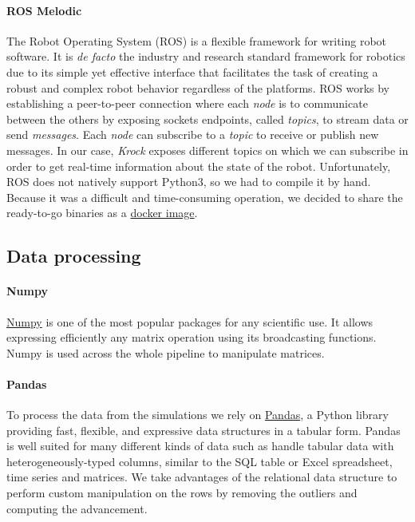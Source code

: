 \documentclass[../document.tex]{subfiles}
\begin{document}
\paragraph{ROS Melodic} The Robot Operating System (ROS) \cite{ROS} is a flexible framework for writing robot software. It is \emph{de facto} the industry and research standard framework for robotics due to its simple yet effective interface that facilitates the task of creating a robust and complex robot behavior regardless of the platforms. ROS works by establishing a peer-to-peer connection where each \emph{node} is to communicate between the others by exposing sockets endpoints, called \emph{topics}, to stream data or send \emph{messages}. Each \emph{node} can subscribe to a \emph{topic} to receive or publish new messages. In our case, \emph{Krock} exposes different topics on which we can subscribe in order to get real-time information about the state of the robot.
Unfortunately, ROS does not natively support Python3, so we had to compile it by hand. Because it was a difficult and time-consuming operation, we decided to share the ready-to-go binaries as a \href{https://hub.docker.com/r/zuppif/ros-melodic-python3/}{docker image}. 

\subsection{Data processing}
\paragraph{Numpy}\href{https://www.numpy.org/}{Numpy} is one of the most popular packages for any scientific use. It allows expressing efficiently any matrix operation using its broadcasting functions. Numpy is used across the whole pipeline to manipulate matrices.
\paragraph{Pandas}To process the data from the simulations we rely on \href{https://pandas.pydata.org/}{Pandas}, a Python library providing fast, flexible, and expressive data structures in a tabular form. Pandas is well suited for many different kinds of data such as handle tabular data with heterogeneously-typed columns, similar to the SQL table or Excel spreadsheet, time series and matrices. We take advantages of the relational data structure to perform custom manipulation on the rows by removing the outliers and computing the advancement.
\end{document}
